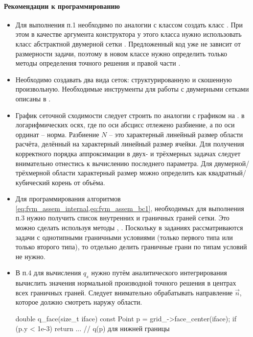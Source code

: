 \paragraph{Рекомендации к программированию}
\begin{itemize}
\item Для выполнения п.1 необходимо по аналогии с классом  создать класс .
      При этом в качестве аргумента конструктора у этого класса нужно использовать класс абстрактной
      двумерной сетки .
      Предложенный код уже не зависит от размерности задачи, поэтому в новом классе нужно определить только
      методы определения точного решения  и правой части .
\item Необходимо создавать два вида сеток: структурированную и скошенную произвольную.
      Необходимые инструменты для работы с двумерными сетками описаны в .
\item График сеточной сходимости следует строить по аналогии с графиком на .
      в логарифмических осях, где по оси абсцисс отлежено разбиение, а по оси ординат -- норма.
      Разбиение $N$ -- это характерный линейный размер области расчёта, делённый на характерный линейный размер ячейки.
      Для получения корректного порядка аппроксимации в двух- и трёхмерных задачах следует внимательно отнестись к вычислению последнего параметра.
      Для двумерной/трёхмерной области характерный размер можно определить как квадратный/кубический корень от объёма.
\item Для программирования алгоритмов \cref{eq:fvm_assem_internal,eq:fvm_assem_bc1}, необходимых для выполнения п.3
      нужно получить список внутренних и граничных граней сетки. Это можно сделать используя методы
      , . Поскольку в заданиях рассматриваются задачи
      с однотипными граничными условиями (только первого типа или только второго типа), то отдельно делить
      граничные грани по типам условий не нужно.
\item В п.4 для вычисления $q_s$ нужно путём аналитического интегрирования вычислить значения нормальной производной точного решения
      в центрах всех граничных граней. Следует внимательно обрабатывать направление $\vec n$, которое должно смотреть наружу области.
\begin{cppcode}
double q_face(size_t iface) const{
    Point p = grid_->face_center(iface);
    if (p.y < 1e-3){
        return ... // q(p) для нижней границы
}}
\end{cppcode}
\end{itemize}
